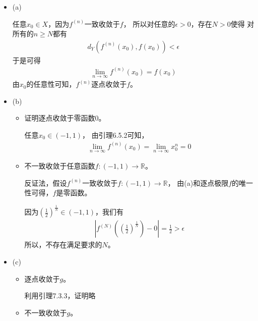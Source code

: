 \documentclass{article}
\begin{document}
\begin{itemize}
  \item (a)

        任意$x_0 \in X$，因为$f^{(n)}$一致收敛于$f$，
        所以对任意的$\epsilon > 0$，存在$N > 0$使得
        对所有的$n \geq N$都有
        \begin{align*}
          d_Y(f^{(n)}(x_0), f(x_0)) < \epsilon
        \end{align*}
        于是可得
        \begin{align*}
          \lim_{n \to \infty} f^{(n)}(x_0) = f(x_0)
        \end{align*}
        由$x_0$的任意性可知，$f^{(n)}$逐点收敛于$f$。

  \item (b)

        \begin{itemize}
          \item 证明逐点收敛于零函数$0$。

                任意$x_0 \in (-1, 1)$， 由引理6.5.2可知，
                \begin{align*}
                  \lim \limits_{n \to \infty} f^{(n)}(x_0) = \lim \limits_{n \to \infty} x_0^n = 0
                \end{align*}

          \item 不一致收敛于任意函数$f: (-1, 1) \to \mathbb{R}$。

                反证法，假设$f^{(n)}$一致收敛于$f: (-1, 1) \to \mathbb{R}$，
                由(a)和逐点极限$f$的唯一性可得，$f$是零函数。

                因为$(\frac{1}{2})^{\frac{1}{N}} \in (-1, 1)$，我们有
                \begin{align*}
                  \left|f^{{(N)}}((\frac{1}{2})^{\frac{1}{N}}) - 0\right| = \frac{1}{2} > \epsilon
                \end{align*}
                所以，不存在满足要求的$N$。
        \end{itemize}
  \item (c)

        \begin{itemize}
          \item 逐点收敛于$g$。

                利用引理7.3.3，证明略

          \item 不一致收敛于$g$。


\end{itemize}
\end{itemize}
\end{document}
